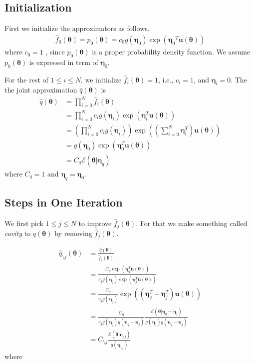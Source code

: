 \documentclass[a4]{article}
\begin{document}
\subsection{Initialization}
First we initialize the approximators as follows.
\begin{equation}
\begin{aligned}
\hat{f}_0(\bm{\theta}) = p_0 (\bm{\theta}) = c_0g(\bm{\eta}_0)
\exp({\bm{\eta}_0}^T\bm{u}(\bm{\theta}))
\end{aligned}
\end{equation}
where $c_0 = 1$ , since  $p_0(\bm{\theta})$ is a proper probability density function.
We assume $p_0(\bm{\theta})$ is expressed in term of $\bm{\eta}_0$.

For the rest of $1 \le i \le N$, we initialize $\hat{f}_i(\bm{\theta}) = 1$, i.e., $c_i = 1$, and $\bm{\eta}_i = 0$.
The the joint approximation $\hat{q}(\bm{\theta})$ is 
\begin{equation}
\begin{aligned}
\hat{q}(\bm{\theta}) &= \prod_{i=0}^N \hat{f}_i(\bm{\theta})\\
&= \prod_{i=0}^N c_ig(\bm{\eta}_i)\exp\left(\bm{\eta}_i^T\bm{u}(\bm{\theta})\right)\\
&= \left(\prod_{i=0}^N c_ig(\bm{\eta}_i)\right)
\exp\left(\left(\sum_{i=0}^N\bm{\eta}_i^T\right)\bm{u}(\bm{\theta})\right)\\
&= g(\bm{\eta}_0)\exp\left(\bm{\eta}_0^T\bm{u}(\bm{\theta})\right)\\
&= C_q\mathcal{E}(\bm{\theta}|\bm{\eta}_q)
\end{aligned}
\end{equation}
where $C_q=1$ and $\bm{\eta}_q = \bm{\eta}_0$.

\subsection{Steps in One Iteration}
We first pick $1 \le j \le N$ to improve $\hat{f}_j(\bm{\theta})$.
For that we make something called \emph{cavity} to $q(\bm{\theta})$ by removing $\hat{f}_j(\bm{\theta})$.

\begin{equation}
\begin{aligned}
\hat{q}_{\setminus j}(\bm{\theta}) &= \frac{\hat{q}(\bm{\theta})}{\hat{f}_j(\bm{\theta})}\\
&= \frac{C_q \exp( \bm{\eta}_q^T\bm{u}(\bm{\theta}))}
{c_j g(\bm{\eta}_j)\exp(\bm{\eta}_j^T\bm{u}(\bm{\theta}))}\\
&= \frac{C_q}{c_j g(\bm{\eta}_j)}\exp(( \bm{\eta}_q^T - \bm{\eta}_j^T)\bm{u}(\bm{\theta}))\\
&=
\frac{C_q}{c_j g(\bm{\eta}_j)g(\bm{\eta}_q - \bm{\eta}_j)}
\frac{\mathcal{E}(\bm{\theta}|\bm{\eta}_q - \bm{\eta}_j)}{g(\bm{\eta}_j)g(\bm{\eta}_q - \bm{\eta}_j)}\\
&=
C_{\setminus j}
\frac{\mathcal{E}(\bm{\theta}|\bm{\eta}_{\setminus j})}{g(\bm{\eta}_{\setminus j})}\label{eq:cavity}
\end{aligned}
\end{equation}
where
\end{document}
